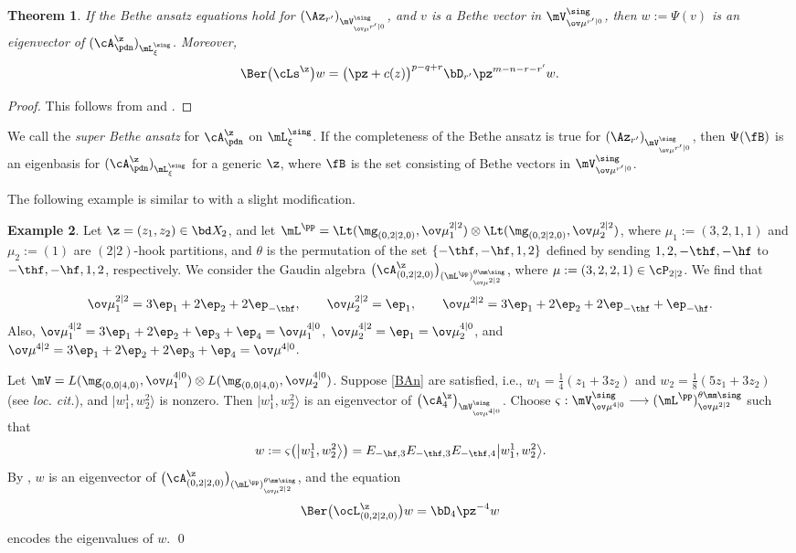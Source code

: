 \documentclass[11pt, reqno]{amsart}
\newtheorem{thm}{Theorem}[section]
\theoremstyle{definition}
\newtheorem{ex}[thm]{Example}
\theoremstyle{remark}
\numberwithin{equation}{section}
\begin{document}
\begin{thm} \label{super-Bethe}
If the Bethe ansatz equations hold for $(\Az_{r'})_{\mV^\sing_{\ov\mu^{r'|0}}}$, and $v$ is a Bethe vector in $\mV^\sing_{\ov\mu^{r'|0}}$, then $w:=\Psi (v)$ is an eigenvector of $(\cA_\pdn^\z)_{\mL^\sing_{\xi}}$.
Moreover,
$$
\Ber \big(\cLs^\z \big) w
 = \big(\pz+c(z) \big)^{p-q+r}  \bD_{r'}  \pz^{m-n-r-r'} w.
$$

\end{thm}

\begin{proof}
This follows from  and .
\end{proof}


We call  the \emph{super Bethe ansatz} for $\cA_\pdn^\z$ on $\mL^\sing_\xi$.
If the completeness of the Bethe ansatz is true for $(\Az_{r'})_{\mV^\sing_{\ov\mu^{r'|0}}}$, then $\Psi (\fB)$ is an eigenbasis for $(\cA_\pdn^\z)_{\mL^\sing_{\xi}}$ for a generic $\z$, where $\fB$ is the set consisting of Bethe vectors in $\mV^\sing_{\ov\mu^{r'|0}}$.

The following example is similar to \cite[Example 5.3]{ChL25} with a slight modification.

\begin{ex} \label{ex-Bethe}
Let $\z=(z_1, z_2) \in {\bd X}_{\! 2}$, and let $\mL^\pp=\Lt(\mg_{(0,2|2,0)}, \ov\mu_1^{2|2})  \otimes \Lt(\mg_{(0,2|2,0)}, \ov\mu_2^{2|2})$,
where $\mu_1:=(3, 2, 1, 1)$ and $\mu_2:=(1)$ are $(2|2)$-hook partitions, and $\theta$ is the permutation of the set $\{-\thf, -\hf, 1, 2\}$ defined by sending $1, 2, -\thf, -\hf$ to $-\thf, -\hf, 1, 2$, respectively.
%
We consider the Gaudin algebra $\big(\cA_{(0,2|2,0)} ^\z\big)_{(\mL^\pp)^{\theta\mm\sing}_{\ov\mu^{2|2}}}$, where $\mu:=(3, 2, 2, 1) \in \cP_{2|2}$.
We find that
$$
\ov\mu_1^{2|2}=3\ep_1+2\ep_2+ 2\ep_{-\thf}, \qquad \ov\mu_2^{2|2}=\ep_1,  \qquad  \ov\mu^{2|2}=3\ep_1+2\ep_2+2 \ep_{-\thf} +\ep_{-\hf}.
$$
Also, $\ov\mu_1^{4|2}=3 \ep_1+2 \ep_2 + \ep_3 + \ep_4=\ov\mu_1^{4|0}$, $\ov\mu_2^{4|2}=\ep_1=\ov\mu_2^{4|0}$, and $\ov\mu^{4|2}=3 \ep_1+2 \ep_2 + 2 \ep_3 + \ep_4=\ov\mu^{4|0}$.

Let $\mV=L(\mg_{(0,0|4,0)}, \ov\mu_1^{4|0}) \otimes L(\mg_{(0,0|4,0)}, \ov\mu_2^{4|0})$.
Suppose \eqref{BAn} are satisfied, i.e.,
$w_1=\frac{1}{4}(z_1+3z_2)$ and $w_2=\frac{1}{8}(5z_1+3z_2)$ (see \emph{loc. cit.}), and $\big|w_1^1, w_2^2 \big\rangle$ is nonzero.
Then $\big|w_1^1, w_2^2 \big\rangle$ is an eigenvector of $\big(\cA_4^\z\big)_{\mV^\sing_{\ov\mu^{4|0}}}$.
Choose $ \varsigma: \mV^\sing_{\ov\mu^{4|0}} \longrightarrow (\mL^\pp)^{\theta\mm\sing}_{\ov\mu^{2|2}}$ such that
\begin{equation} \label{w}
w:=\varsigma \big( \big|w_1^1, w_2^2 \big\rangle \big)= E_{-\hf, 3} E_{-\thf, 3}  E_{-\thf, 4}   \big|w_1^1, w_2^2 \big\rangle.
\end{equation}
By , $w$ is an eigenvector of $\big(\cA_{(0,2|2,0)} ^\z\big)_{(\mL^\pp)^{\theta\mm\sing}_{\ov\mu^{2|2}}}$, and the equation
$$
\Ber \big(\ocL_{(0,2|2,0)} ^\z \big) w =\bD_4 \pz^{-4} w
$$
encodes the eigenvalues of $w$.
\qed
\end{ex}
\end{document}
